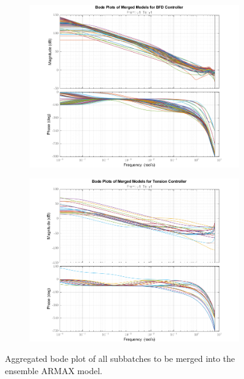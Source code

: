 \begin{figure}[hp]
    \centering
    \begin{subfigure}[b]{0.9\textwidth}
        \centering
        \includegraphics[width=\textwidth]{figures/bode_armax_kd.png}
    \end{subfigure}
    
    \begin{subfigure}[b]{0.9\textwidth}
        \centering
        \includegraphics[width=\textwidth]{figures/bode_armax_kt.png}
    \end{subfigure}
    \caption{Aggregated bode plot of all subbatches to be merged into the ensemble ARMAX model.}
    \label{fig:bode_armax_kd_kt}
\end{figure}

